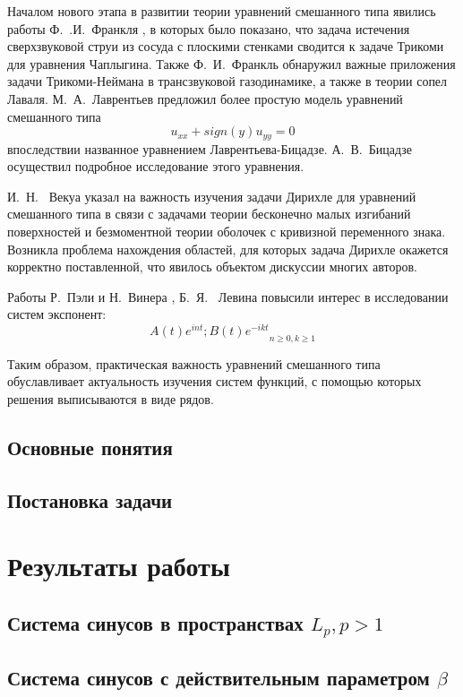﻿\documentclass[oneside, final, 14pt]{extreport}
\begin{document}
Началом нового этапа в развитии теории уравнений смешанного типа
явились работы Ф.~.И.~Франкля \cite{frankl-laval, frankl-eq}, в которых было показано, что задача
истечения сверхзвуковой струи из сосуда с плоскими стенками сводится к
задаче Трикоми для уравнения Чаплыгина. Также Ф.~И.~Франкль обнаружил важные приложения задачи Трикоми-Неймана в трансзвуковой
газодинамике, а также в теории сопел Лаваля. М.~А.~Лаврентьев предложил \cite{lavrentiev-bitsadze} более
простую модель уравнений смешанного типа
$$u_{xx} + sign(y) u_{yy} = 0$$
впоследствии названное уравнением Лаврентьева-Бицадзе. А.~В.~Бицадзе
осуществил подробное исследование этого уравнения.

И.~Н.~ Векуа указал \cite{vekua} на важность изучения задачи Дирихле для уравнений
смешанного типа в связи с задачами теории бесконечно малых изгибаний
поверхностей и безмоментной теории оболочек с кривизной переменного
знака. Возникла проблема нахождения областей, для которых задача Дирихле
окажется корректно поставленной, что явилось объектом дискуссии многих
авторов.

Работы Р.~Пэли и Н.~Винера \cite{paley-wiener}, Б.~Я.~ Левина \cite{levin} повысили интерес в исследовании 
систем экспонент:
$${A(t)e^{int}; B(t)e^{-ikt}}_{n \geqslant 0, k \geqslant 1}$$

Таким образом, практическая важность уравнений смешанного типа обуславливает 
актуальность изучения систем функций, с помощью которых решения выписываются в виде рядов.

\section{Основные понятия}
\section{Постановка задачи}


\chapter*{Результаты работы}

\section{Система синусов в пространствах $L_p, p > 1$}

\section{Система синусов с действительным параметром $\beta$}
\end{document}
